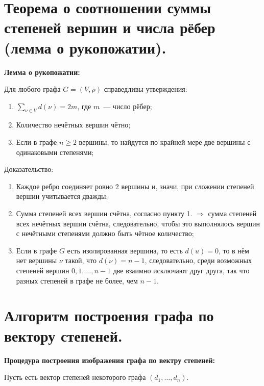 \section{Теорема о соотношении суммы степеней вершин и числа рёбер (лемма
о рукопожатии).}

\textbf{Лемма о рукопожатии:}
    \smallskip

    Для любого графа $G = (V, \rho)$ справедливы утверждения:

    \begin{enumerate}
        \item{$\sum\limits_{\nu \in V} d(\nu) = 2m$, где $m$~--- число рёбер;}
        \item{Количество нечётных вершин чётно;}
        \item{Если в графе $n \geq 2$ вершины, то найдутся по крайней мере две
        вершины с одинаковыми степенями;}
    \end{enumerate}
    \bigskip

    Доказательство:
    \bigskip

    \begin{enumerate}
        \item{Каждое ребро соединяет ровно 2 вершины и, значи, при сложении
        степеней вершин учитывается дважды;}
        \item{Сумма степеней всех вершин счётна, согласно пункту 1. $\Rightarrow$
        сумма степеней всех нечётных вершин счётна, следовательно, чтобы это
        выполнялось вершин с нечётными степенями должно быть чётное количество;}
        \item{Если в графе $G$ есть изолированная вершина, то есть $d(u) = 0$,
        то в нём нет вершины $\nu$ такой, что $d(\nu) = n - 1$, следовательно,
        среди возможных степеней вершин $0, 1, \dots, n - 1$ две взаимно
        исключают друг друга, так что разных степеней в графе не более, чем $n-1$.}
    \end{enumerate}

\section{Алгоритм построения графа по вектору степеней.}

\textbf{Процедура построения изображения графа по вектру степеней:}
    \smallskip

    Пусть есть вектор степеней некоторого графа $(d_1, \dots, d_n)$.

